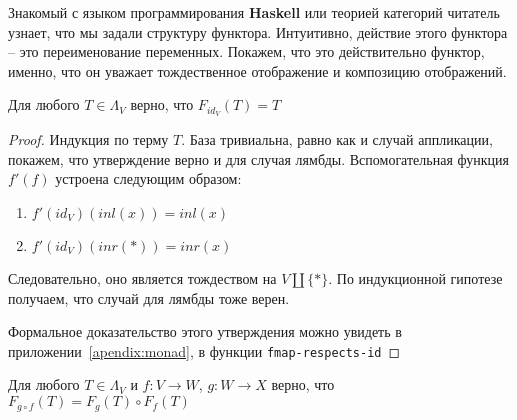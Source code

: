 Знакомый с языком программирования \textbf{Haskell} или теорией категорий читатель узнает, что мы задали структуру функтора. Интуитивно, действие этого функтора -- это переименование переменных. Покажем, что это действительно функтор, именно, что он уважает тождественное отображение и композицию отображений.

\begin{prop}
  \label{monad:fmap-resp-id}
  Для любого $T \in \Lambda_{V}$ верно, что $F_{id_{V}}(T) = T$
\end{prop}

\begin{proof}
  Индукция по терму $T$. База тривиальна, равно как и случай аппликации, покажем, что утверждение верно и для случая лямбды. Вспомогательная функция $f'(f)$ устроена следующим образом:
  \begin{enumerate}
    \item $f'(id_{V})(inl(x)) = inl(x)$
    \item $f'(id_{V})(inr(*)) = inr(x)$
  \end{enumerate}
  Следовательно, оно является тождеством на $V \coprod \{*\}$. По индукционной гипотезе получаем, что случай для лямбды тоже верен.

  Формальное доказательство этого утверждения можно увидеть в приложении~\ref{apendix:monad}, в функции \texttt{fmap-respects-id}
\end{proof}

\begin{prop}
  \label{monad:fmap-resp-comp}
  Для любого $T \in \Lambda_{V}$ и $f : V \to W$, $g : W \to X$ верно, что $F_{g \circ f}(T) = F_{g}(T) \circ F_{f}(T)$
\end{prop}

